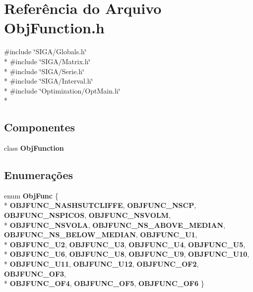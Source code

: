 \section{Referência do Arquivo Obj\+Function.\+h}
\label{_obj_function_8h}
{\ttfamily \#include \char`\"{}S\+I\+G\+A/\+Globals.\+h\char`\"{}}\\*
{\ttfamily \#include \char`\"{}S\+I\+G\+A/\+Matrix.\+h\char`\"{}}\\*
{\ttfamily \#include \char`\"{}S\+I\+G\+A/\+Serie.\+h\char`\"{}}\\*
{\ttfamily \#include \char`\"{}S\+I\+G\+A/\+Interval.\+h\char`\"{}}\\*
{\ttfamily \#include \char`\"{}Optimization/\+Opt\+Main.\+h\char`\"{}}\\*
\subsection*{Componentes}
\begin{DoxyCompactItemize}
\item 
class {\bf Obj\+Function}
\end{DoxyCompactItemize}
\subsection*{Enumerações}
\begin{DoxyCompactItemize}
\item 
enum {\bf Obj\+Func} \{ \\*
{\bf O\+B\+J\+F\+U\+N\+C\+\_\+\+N\+A\+S\+H\+S\+U\+T\+C\+L\+I\+F\+FE}, 
{\bf O\+B\+J\+F\+U\+N\+C\+\_\+\+N\+S\+CP}, 
{\bf O\+B\+J\+F\+U\+N\+C\+\_\+\+N\+S\+P\+I\+C\+OS}, 
{\bf O\+B\+J\+F\+U\+N\+C\+\_\+\+N\+S\+V\+O\+LM}, 
\\*
{\bf O\+B\+J\+F\+U\+N\+C\+\_\+\+N\+S\+V\+O\+LA}, 
{\bf O\+B\+J\+F\+U\+N\+C\+\_\+\+N\+S\+\_\+\+A\+B\+O\+V\+E\+\_\+\+M\+E\+D\+I\+AN}, 
{\bf O\+B\+J\+F\+U\+N\+C\+\_\+\+N\+S\+\_\+\+B\+E\+L\+O\+W\+\_\+\+M\+E\+D\+I\+AN}, 
{\bf O\+B\+J\+F\+U\+N\+C\+\_\+\+U1}, 
\\*
{\bf O\+B\+J\+F\+U\+N\+C\+\_\+\+U2}, 
{\bf O\+B\+J\+F\+U\+N\+C\+\_\+\+U3}, 
{\bf O\+B\+J\+F\+U\+N\+C\+\_\+\+U4}, 
{\bf O\+B\+J\+F\+U\+N\+C\+\_\+\+U5}, 
\\*
{\bf O\+B\+J\+F\+U\+N\+C\+\_\+\+U6}, 
{\bf O\+B\+J\+F\+U\+N\+C\+\_\+\+U8}, 
{\bf O\+B\+J\+F\+U\+N\+C\+\_\+\+U9}, 
{\bf O\+B\+J\+F\+U\+N\+C\+\_\+\+U10}, 
\\*
{\bf O\+B\+J\+F\+U\+N\+C\+\_\+\+U11}, 
{\bf O\+B\+J\+F\+U\+N\+C\+\_\+\+U12}, 
{\bf O\+B\+J\+F\+U\+N\+C\+\_\+\+O\+F2}, 
{\bf O\+B\+J\+F\+U\+N\+C\+\_\+\+O\+F3}, 
\\*
{\bf O\+B\+J\+F\+U\+N\+C\+\_\+\+O\+F4}, 
{\bf O\+B\+J\+F\+U\+N\+C\+\_\+\+O\+F5}, 
{\bf O\+B\+J\+F\+U\+N\+C\+\_\+\+O\+F6}
 \}
\end{DoxyCompactItemize}
